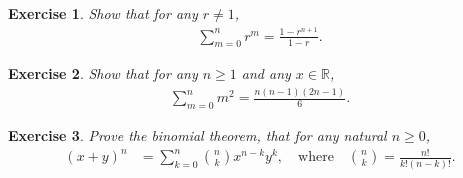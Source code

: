 \documentclass{article}[12pt]
\newtheorem{exercise}{Exercise}[section]
\newcommand{\R}{\mathbb{R}}
\begin{document}
        \begin{exercise}
            Show that for any $r \ne 1$,
            \begin{align}
                \sum_{m=0}^n r^m = \frac{1 - r^{n+1}}{1 - r}.
            \end{align}
        \end{exercise}
        
        \begin{exercise}
            Show that for any $n \ge 1$ and any $x \in \R$,
            \begin{align}
                \sum_{m=0}^n m^2 = \frac{n(n-1)(2n-1)}{6}.
            \end{align}
        \end{exercise}
        
        
        \begin{exercise}
            Prove the binomial theorem, that for any natural $n \ge 0$,
            \begin{align}
                (x + y)^n
                &= \sum_{k=0}^n \binom{n}{k} x^{n-k} y^k,
                \quad\text{where}\quad
                \binom{n}{k} = \frac{n!}{k! (n-k)!}.
            \end{align}
        \end{exercise}
        
        
        
\end{document}
